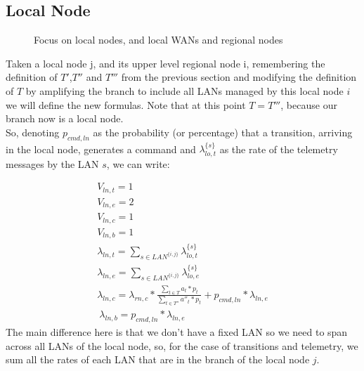 \documentclass[11pt]{article}
\begin{document}
\subsection{Local Node}
\begin{figure}[H]
	\centering
	\hspace*{-3.7cm}
	\frame{}
	\caption{Focus on local nodes, and local WANs and regional nodes}
\end{figure}

Taken a local node j, and its upper level regional node i, remembering the definition of $T'$,$T''$ and $T'''$ from the previous section and modifying the definition of $T$ by amplifying the branch to include all LANs managed by this local node $i$ we will define the new formulas. Note that at this point $T = T'''$, because our branch now is a local node. \\

So, denoting $p_{cmd,ln}$ as the probability (or percentage) that a transition, arriving in the local node, generates a command and $\lambda^{\{s\}}_{lo, t}$ as the rate of the telemetry messages by the LAN $s$, we can write:

\begin{equation}
    \begin{array}{l}
        V_{ln, t} = 1 \\
        V_{ln, e} = 2 \\ %
        V_{ln, c} = 1 \\
        V_{ln, b} = 1 \\
        \lambda_{ln, t} = \sum\limits_{s \in LAN^{\{i,j\}}}{\lambda^{\{s\}}_{lo, t}}  \\
        \lambda_{ln, e} = \sum\limits_{s \in LAN^{\{i,j\}}}{\lambda^{\{s\}}_{lo, e}} \\
		\lambda_{ln, c} = \lambda_{rn, c} *\frac{\sum\limits_{t \in T}{a_{t} * p_{t}}}{\sum\limits_{t \in T''}{a''_{t} * p_{t}}}  + p_{cmd,ln} * \lambda_{ln, e} \\\

        \lambda_{ln, b} = p_{cmd, ln} * \lambda_{ln,e}

    \end{array}
\end{equation}
The main difference here is that we don't have a fixed LAN so we need to span across all LANs of the local node, so, for the case of transitions and telemetry, we sum all the rates of each LAN that are in the branch of the local node $j$. \\
\end{document}

